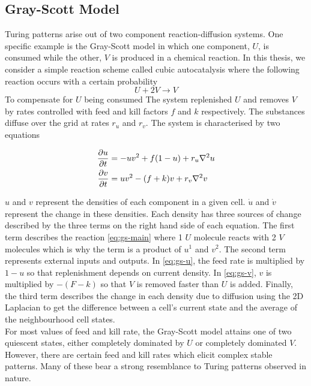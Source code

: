 \subsection{Gray-Scott Model}

Turing patterns arise out of two component reaction-diffusion systems. One specific example is the Gray-Scott model\cite{gray1983autocatalytic} in which one component, $U$, is consumed while the other, $V$ is produced in a chemical reaction. In this thesis, we consider a simple reaction scheme called cubic autocatalysis where the following reaction occurs with a certain probability
\begin{equation}\label{eq:gs-main}
  U + 2V \rightarrow V
\end{equation}
To compensate for $U$ being consumed The system replenished $U$ and removes $V$ by rates controlled with feed and kill factors $f$ and $k$ respectively. The substances diffuse over the grid at rates $r_u$ and $r_v$. The system is characterised by two equations
\begin{definition} \label{def:reaction-diffusion}
\begin{align} 
  \label{eq:gs-u} \pdv{u}{t} &= -uv^2 + f(1-u) + r_u \nabla^2 u\\
  \label{eq:gs-v} \pdv{v}{t} &= uv^2 - (f+k)v + r_v \nabla^2 v
\end{align}
\end{definition}
$u$ and $v$ represent the densities of each component in a given cell. $\dot{u}$ and $\dot{v}$ represent the change in these densities. Each density has three sources of change described by the three terms on the right hand side of each equation. The first term describes the reaction \ref{eq:gs-main} where 1 $U$ molecule reacts with 2 $V$ molecules which is why the term is a product of $u^1$ and $v^2$. The second term represents external inputs and outputs. In \ref{eq:gs-u}, the feed rate is multiplied by $1-u$ so that replenishment depends on current density. In \ref{eq:gs-v}, $v$ is multiplied by $-(F-k)$ so that $V$ is removed faster than $U$ is added. Finally, the third term describes the change in each density due to diffusion using the 2D Laplacian to get the difference between a cell's current state and the average of the neighbourhood cell states.\\

For most values of feed and kill rate, the Gray-Scott model attains one of two quiescent states, either completely dominated by $U$ or completely dominated $V$. However, there are certain feed and kill rates which elicit complex stable patterns. Many of these bear a strong resemblance to Turing patterns observed in nature.

